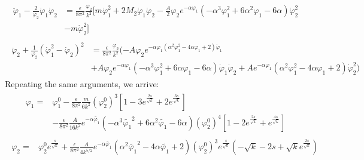 \begin{align}
    \begin{split}
    \ddot \varphi_{1} - \frac{2}{\varphi_{2}} \dot \varphi_{1} \dot \varphi_{2} & = \frac{\epsilon}{8\pi^{2}}\frac{\varphi_{2}}{k^{2}} [m\dot \varphi_{1}^{2} + 2M_{2} \dot \varphi_{1} \dot \varphi_{2} - \frac{A}{2} \varphi_{2} e^{-\alpha\varphi_{1}} (-\alpha^{3} \varphi_{1} ^{2} + 6\alpha^{2} \varphi_{1} -6\alpha)\dot \varphi_{2}^{2}  \\
    & - m\dot \varphi_{2}^{2}]
    \end{split}
\end{align}
\begin{align}
    \begin{split}
    \ddot \varphi_{2} + \frac{1}{\varphi_{2}} (\dot \varphi_{1}^{2} - \dot \varphi_{2})^{2}  &= \frac{\epsilon}{8\pi^{2}}\frac{\varphi_{2}}{k^{2}}(-A\varphi_{2} e^{-\alpha\varphi_{1} (\alpha^{2} \varphi_{1}^{2} - 4\alpha\varphi_{1} + 2 )\dot \varphi_{1}}  \\
    &+ A \varphi_{2} e^{-\alpha\varphi_{1}} (-\alpha^{3} \varphi_{1} ^{2} +6\alpha\varphi_{1} -6\alpha )\dot \varphi_{1} \dot \varphi_{2} + A e^{-\alpha\varphi_{1}} (\alpha^{2} \varphi_{1} ^{2} - 4\alpha \varphi_{1} +2)\dot \varphi_{2} ^{2})
    \end{split}
\end{align}
Repeating the same arguments, we arrive:
\begin{align}
    \begin{split}
        \varphi_{1} = & \varphi_{1}^{0} - \frac{\epsilon}{8\pi^{2}}\frac{m}{6k^{2}}(\varphi_{2}^{0})^{3}[1-3e^{\frac{2s}{\sqrt{k}}} + 2e^{\frac{3s}{\sqrt{k}}}] \\
        & - \frac{\epsilon}{8\pi^{2}}\frac{A}{16k^{2}} e^{-\alpha \tilde{\varphi_{1}}} (-\alpha^{3}\tilde{\varphi_{1}}^{2} + 6\alpha^{2} \tilde{\varphi_{1}} - 6\alpha)(\varphi_{2}^{0})^{4} [1 - 2e^{\frac{2s}{\sqrt{k}}} + e^{\frac{4s}{\sqrt{k}}}]
    \end{split}
\end{align}
\begin{align}
    \begin{split}
        \varphi_{2} = & \varphi_{2}^{0} e^{\frac{s}{\sqrt{k}}} + \frac{\epsilon}{8\pi^{2}}\frac{A}{4k^{5/2}}e^{-\alpha \tilde{\varphi_{1}}} (\alpha^{2} \tilde{\varphi_{1}}^{2} - 4\alpha\tilde{\varphi_{1}}+2)(\varphi_{2}^{0})^{3} e^{\frac{s}{\sqrt{k}}}(-\sqrt{k} - 2s + \sqrt{k} e^{\frac{2s}{\sqrt{k}}})
    \end{split}
\end{align}

